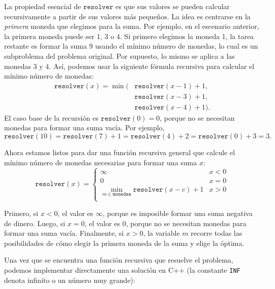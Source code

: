 La propiedad esencial de $\texttt{resolver}$ es
que sus valores se pueden
calcular recursivamente a partir de sus valores más pequeños.
La idea es centrarse en la \emph{primera}
moneda que elegimos para la suma.
Por ejemplo, en el escenario anterior,
la primera moneda puede ser 1, 3 o 4.
Si primero elegimos la moneda 1,
la tarea restante es formar la suma 9
usando el mínimo número de monedas,
lo cual es un subproblema del problema original.
Por supuesto, lo mismo se aplica a las monedas 3 y 4.
Así, podemos usar la siguiente fórmula recursiva
para calcular el mínimo número de monedas:
\begin{equation*}
    \begin{split}
        \texttt{resolver}(x) = \min( & \texttt{resolver}(x-1)+1, \\
        & \texttt{resolver}(x-3)+1, \\
        & \texttt{resolver}(x-4)+1).
    \end{split}
\end{equation*}
El caso base de la recursión es $\texttt{resolver}(0)=0$,
porque no se necesitan monedas para formar una suma vacía.
Por ejemplo,
\[ \texttt{resolver}(10) = \texttt{resolver}(7)+1 = \texttt{resolver}(4)+2 = \texttt{resolver}(0)+3 = 3.\]

Ahora estamos listos para dar una función recursiva general
que calcule el mínimo número de
monedas necesarias para formar una suma $x$:
\begin{equation*}
    \texttt{resolver}(x) = \begin{cases}
        \infty                                                 & x < 0 \\
        0                                                      & x = 0 \\
        \min_{m \in \texttt{monedas}} \texttt{resolver}(x-c)+1 & x > 0 \\
    \end{cases}
\end{equation*}

Primero, si $x<0$, el valor es $\infty$,
porque es imposible formar una suma
negativa de dinero.
Luego, si $x=0$, el valor es $0$,
porque no se necesitan monedas para formar una suma vacía.
Finalmente, si $x>0$, la variable $m$ recorre
todas las posibilidades de cómo elegir la primera moneda
de la suma y elige la óptima.

Una vez que se encuentra una función recursiva que resuelve el problema,
podemos implementar directamente una solución en C++
(la constante \texttt{INF} denota infinito o un número muy grande):

